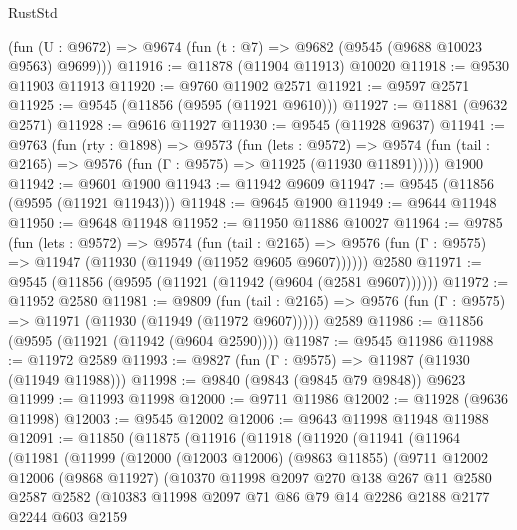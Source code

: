 \begin{lexlean}{RustStd}
\begin{coremodule}
    (fun (U : @9672) => @9674 (fun (t : @7) => @9682 (@9545 (@9688 @10023 @9563) @9699)))
@11916 := @11878 (@11904 @11913) @10020
@11918 := @9530 @11903 @11913
@11920 := @9760 @11902 @2571
@11921 := @9597 @2571
@11925 := @9545 (@11856 (@9595 (@11921 @9610)))
@11927 := @11881 (@9632 @2571)
@11928 := @9616 @11927
@11930 := @9545 (@11928 @9637)
@11941 := @9763
    (fun (rty : @1898) =>
    @9573
      (fun (lets : @9572) =>
      @9574 (fun (tail : @2165) => @9576 (fun (Γ : @9575) => @11925 (@11930 @11891)))))
    @1900
@11942 := @9601 @1900
@11943 := @11942 @9609
@11947 := @9545 (@11856 (@9595 (@11921 @11943)))
@11948 := @9645 @1900
@11949 := @9644 @11948
@11950 := @9648 @11948
@11952 := @11950 @11886 @10027
@11964 := @9785
    (fun (lets : @9572) =>
    @9574
      (fun (tail : @2165) =>
      @9576 (fun (Γ : @9575) => @11947 (@11930 (@11949 (@11952 @9605 @9607))))))
    @2580
@11971 := @9545 (@11856 (@9595 (@11921 (@11942 (@9604 (@2581 @9607))))))
@11972 := @11952 @2580
@11981 := @9809
    (fun (tail : @2165) => @9576 (fun (Γ : @9575) => @11971 (@11930 (@11949 (@11972 @9607)))))
    @2589
@11986 := @11856 (@9595 (@11921 (@11942 (@9604 @2590))))
@11987 := @9545 @11986
@11988 := @11972 @2589
@11993 := @9827 (fun (Γ : @9575) => @11987 (@11930 (@11949 @11988)))
@11998 := @9840 (@9843 (@9845 @79 @9848)) @9623
@11999 := @11993 @11998
@12000 := @9711 @11986
@12002 := @11928 (@9636 @11998)
@12003 := @9545 @12002
@12006 := @9643 @11998 @11948 @11988
@12091 := @11850
    (@11875
      (@11916
        (@11918
          (@11920
            (@11941
              (@11964
                (@11981
                  (@11999
                    (@12000
                      (@12003 @12006)
                      (@9863 @11855)
                      (@9711
                        @12002
                        @12006
                        (@9868 @11927)
                        (@10370
                          @11998
                          @2097
                          @270
                          @138
                          @267
                          @11
                          @2580
                          @2587
                          @2582
                          (@10383
                            @11998
                            @2097
                            @71
                            @86
                            @79
                            @14
                            @2286
                            @2188
                            @2177
                            @2244
                            @603
                            @2159

\end{coremodule}
\end{lexlean}
